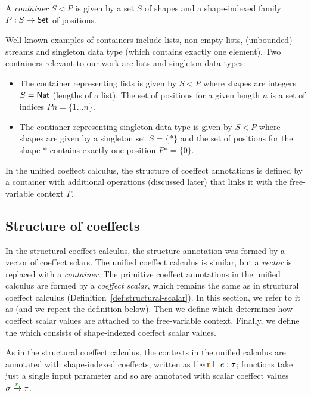 \begin{definition}
A \emph{container} $S \triangleleft P$ is given by a set $S$ of shapes and a shape-indexed family
$P : S \rightarrow \textnormal{\sffamily Set}$ of positions.
\end{definition}

\noindent
Well-known examples of containers include lists, non-empty lists, (un\-boun\-ded) streams and 
singleton data type (which contains exactly one element). Two containers relevant to our work
are lists and singleton data types:

\begin{itemize}
\item The container representing lists is given by $S \triangleleft P$ where 
  shapes are integers $S = \ident{Nat}$ (lengths of a list). The set of positions for a 
  given length $n$ is a set of indices $P n = \{ 1 \ldots n \}$.

\item The contianer representing singleton data type is given by $S \triangleleft P$ where
  shapes are given by a singleton set $S = \{ \ast \}$ and the set of positions for the
  shape $\ast$ contains exactly one position $P \ast = \{ 0 \}$.
\end{itemize}

\noindent
In the unified coeffect calculus, the structure of coeffect annotations is defined by a 
container with additional operations (discussed later) that links it with the free-variable 
context $\Gamma$. 

\subsection{Structure of coeffects}
In the structural coeffect calculus, the structure annotation was formed by a vector of coeffect
sclars. The unified coeffect calculus is similar, but a \emph{vector} is replaced with a 
\emph{container}. The primitive coeffect annotations in the unified calculus are formed by
a \emph{coeffect scalar}, which remains the same as in structural coeffect calculus
(Definition~\ref{def:structural-scalar}). In this section, we refer to it as
\emph{} (and we repeat the definition below). Then we
define \emph{} which determines how coeffect scalar values 
are attached to the free-variable context. Finally, we define the \emph{} which consists of shape-indexed coeffect scalar values.

As in the structural coeffect calculus, the contexts in the unified calculus are annotated with 
shape-indexed coeffects, written as $\coctx{\Gamma}{\aclrd{\textbf{r}}} \vdash e : \tau$; 
functions take just a single input parameter and so are annotated with scalar coeffect values 
$\sigma \xrightarrow{\cclrd{r}} \tau$.

